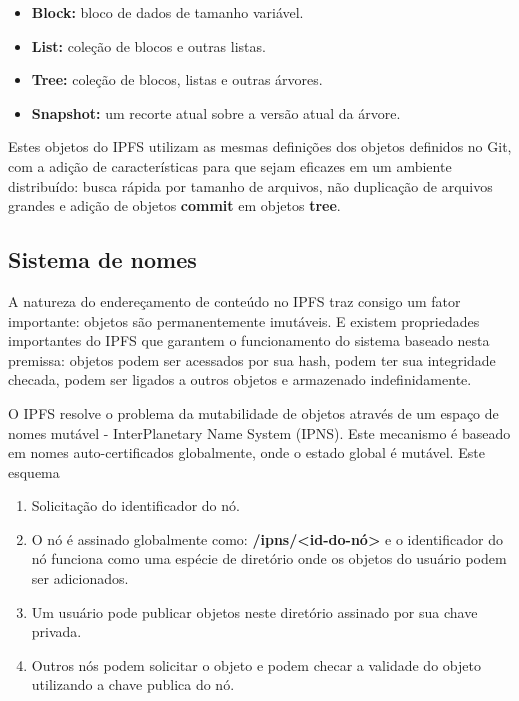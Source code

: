\documentclass[tcc,capa]{texufpel}
\begin{document}
        \begin{itemize}
            \item \textbf{Block:} bloco de dados de tamanho variável.
            \item \textbf{List:} coleção de blocos e outras listas.
            \item \textbf{Tree:} coleção de blocos, listas e outras árvores.
            \item \textbf{Snapshot:} um recorte atual sobre a versão atual da árvore.
        \end{itemize}
        
        Estes objetos do IPFS utilizam as mesmas definições dos objetos definidos no Git, com a adição de características para que sejam eficazes em um ambiente distribuído: busca rápida por tamanho de arquivos, não duplicação de arquivos grandes e adição de objetos \textbf{commit} em objetos \textbf{tree}. 
        
        \subsection{Sistema de nomes}
        
        A natureza do endereçamento de conteúdo no IPFS traz consigo um fator importante: objetos são permanentemente imutáveis. E existem propriedades importantes do IPFS que garantem o funcionamento do sistema baseado nesta premissa: objetos podem ser acessados por sua hash, podem ter sua integridade checada, podem ser ligados a outros objetos e armazenado indefinidamente.
        
        O IPFS resolve o problema da mutabilidade de objetos através de um espaço de nomes mutável - InterPlanetary Name System (IPNS). Este mecanismo é baseado em nomes auto-certificados globalmente, onde o estado global é mutável. Este esquema 
        
        \begin{enumerate}
            \item Solicitação do identificador do nó.
            \item O nó é assinado globalmente como: \textbf{/ipns/<id-do-nó>} e o identificador do nó funciona como uma espécie de diretório onde os objetos do usuário podem ser adicionados.
            \item Um usuário pode publicar objetos neste diretório assinado por sua chave privada.
            \item Outros nós podem solicitar o objeto e podem checar a validade do objeto utilizando a chave publica do nó.
        \end{enumerate}
        
\end{document}
